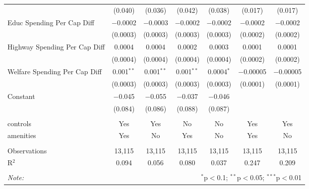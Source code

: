 \begin{table}[!htbp]
\begin{tabular}{@{\extracolsep{5pt}}lcccccc}
  & (0.040) & (0.036) & (0.042) & (0.038) & (0.017) & (0.017) \\ 
  Educ Spending Per Cap Diff & $-$0.0002 & $-$0.0003 & $-$0.0002 & $-$0.0002 & $-$0.0002 & $-$0.0002 \\ 
  & (0.0003) & (0.0003) & (0.0003) & (0.0003) & (0.0002) & (0.0002) \\ 
  Highway Spending Per Cap Diff & 0.0004 & 0.0004 & 0.0002 & 0.0003 & 0.0001 & 0.0001 \\ 
  & (0.0004) & (0.0004) & (0.0004) & (0.0004) & (0.0002) & (0.0002) \\ 
  Welfare Spending Per Cap Diff & 0.001$^{**}$ & 0.001$^{**}$ & 0.001$^{**}$ & 0.0004$^{*}$ & $-$0.00005 & $-$0.00005 \\ 
  & (0.0003) & (0.0003) & (0.0003) & (0.0003) & (0.0001) & (0.0001) \\ 
  Constant & $-$0.045 & $-$0.055 & $-$0.037 & $-$0.046 &  &  \\ 
  & (0.084) & (0.086) & (0.088) & (0.087) &  &  \\ 
 \hline \\[-1.8ex] 
controls & Yes & Yes & No & No & Yes & Yes \\ 
amenities & Yes & No & Yes & No & Yes & No \\ 
\hline \\[-1.8ex] 
Observations & 13,115 & 13,115 & 13,115 & 13,115 & 13,115 & 13,115 \\ 
R$^{2}$ & 0.094 & 0.056 & 0.080 & 0.037 & 0.247 & 0.209 \\ 
\hline 
\hline \\[-1.8ex] 
\textit{Note:}  & \multicolumn{6}{r}{$^{*}$p$<$0.1; $^{**}$p$<$0.05; $^{***}$p$<$0.01} \\ 
\end{tabular} 
\end{table} 
